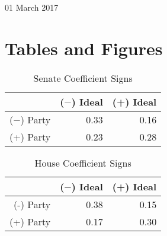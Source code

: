 \documentclass[12pt]{article}
\begin{document}
	
\begin{center}
	\Large 01 March 2017
\end{center}
	
\section{Tables and Figures}
	
\begin{table}[ht]
	\centering
	\caption{Senate Coefficient Signs}
	\begin{tabular}{rrr}
		\hline
		& ($-$) Ideal & (+) Ideal \\ 
		\hline
		($-$) Party & 0.33 & 0.16 \\ 
		(+) Party & 0.23 & 0.28 \\ 
		\hline
	\end{tabular}
\end{table}

\begin{table}[ht]
	\centering
	\caption{House Coefficient Signs}
	\begin{tabular}{rrr}
		\hline
		& ($-$) Ideal & (+) Ideal \\ 
		\hline
		(-) Party & 0.38 & 0.15 \\ 
		(+) Party & 0.17 & 0.30 \\ 
		\hline
	\end{tabular}
\end{table}
\end{document}
